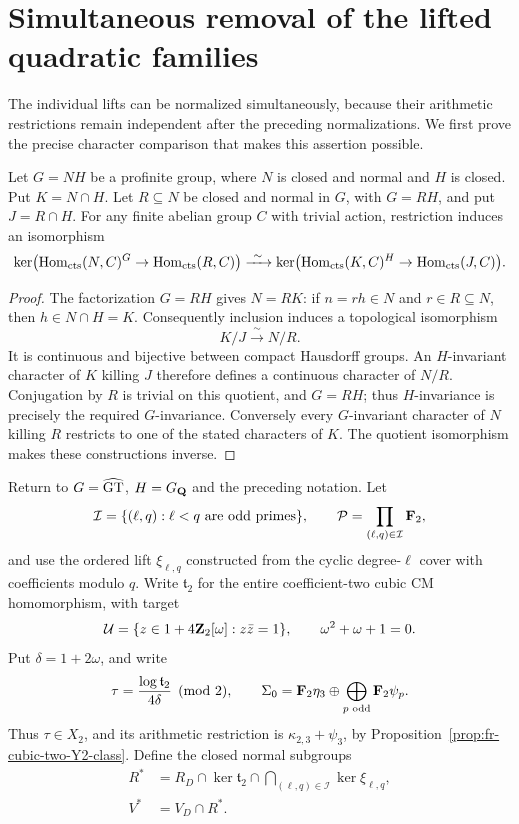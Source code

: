 \section{Simultaneous removal of the lifted quadratic families}
\label{sec:simultaneous-quadratic-normalization}

The individual lifts can be normalized simultaneously, because their
arithmetic restrictions remain independent after the preceding
normalizations. We first prove the precise character comparison that
makes this assertion possible.

\begin{lemma}\label{lem:arithmetic-normalization-annihilator}
Let \(G=NH\) be a profinite group, where \(N\) is closed and normal
and \(H\) is closed. Put \(K=N\cap H\). Let \(R\subseteq N\)
be closed and normal in \(G\), with \(G=RH\), and put
\(J=R\cap H\). For any finite abelian group \(C\) with trivial
action, restriction induces an isomorphism
\[
 \ker\bigl(\operatorname{Hom}_{\rm cts}(N,C)^G
                 \to\operatorname{Hom}_{\rm cts}(R,C)\bigr)
 \xrightarrow{\ \sim\ }
 \ker\bigl(\operatorname{Hom}_{\rm cts}(K,C)^H
                 \to\operatorname{Hom}_{\rm cts}(J,C)\bigr).
\]
\end{lemma}
\begin{proof}
The factorization \(G=RH\) gives \(N=RK\): if \(n=rh\in N\)
and \(r\in R\subseteq N\), then \(h\in N\cap H=K\).
Consequently inclusion induces a topological isomorphism
\[
                         K/J\xrightarrow{\ \sim\ }N/R.
\]
It is continuous and bijective between compact Hausdorff groups.
An \(H\)-invariant character of \(K\) killing \(J\) therefore
defines a continuous character of \(N/R\). Conjugation by \(R\)
is trivial on this quotient, and \(G=RH\); thus \(H\)-invariance
is precisely the required \(G\)-invariance. Conversely every
\(G\)-invariant character of \(N\) killing \(R\) restricts to
one of the stated characters of \(K\). The quotient isomorphism
makes these constructions inverse.
\end{proof}

Return to \(G=\widehat{\mathrm{GT}}\), \(H=G_{\mathbf Q}\) and the preceding notation.
Let
\[
 \mathcal I=\{(\ell,q):\ell<q\text{ are odd primes}\},\qquad
 \mathcal P=\prod_{(\ell,q)\in\mathcal I}\mathbf F_2,
\]
and use the ordered lift \(\xi_{\ell,q}\) constructed from the
cyclic degree-\(\ell\) cover with coefficients modulo \(q\).
Write \(\mathfrak t_2\) for the entire coefficient-two cubic CM
homomorphism, with target
\[
 \mathcal U=\{z\in1+4\mathbf Z_2[\omega]:z\bar z=1\},
 \qquad \omega^2+\omega+1=0.
\]
Put \(\delta=1+2\omega\), and write
\[
 \tau=\frac{\log\mathfrak t_2}{4\delta}\pmod2,
 \qquad
 \Sigma_0=\mathbf F_2\eta_3\oplus
                 \bigoplus_{p\text{ odd}}\mathbf F_2\psi_p.
\]
Thus \(\tau\in X_2\), and its arithmetic restriction is
\(\kappa_{2,3}+\psi_3\), by
Proposition~\ref{prop:fr-cubic-two-Y2-class}.
Define the closed normal subgroups
\[
 \begin{split}
 R^*&=R_D\cap\ker\mathfrak t_2
                   \cap\bigcap_{(\ell,q)\in\mathcal I}\ker\xi_{\ell,q},\\
 V^*&=V_D\cap R^*.
 \end{split}
\]

